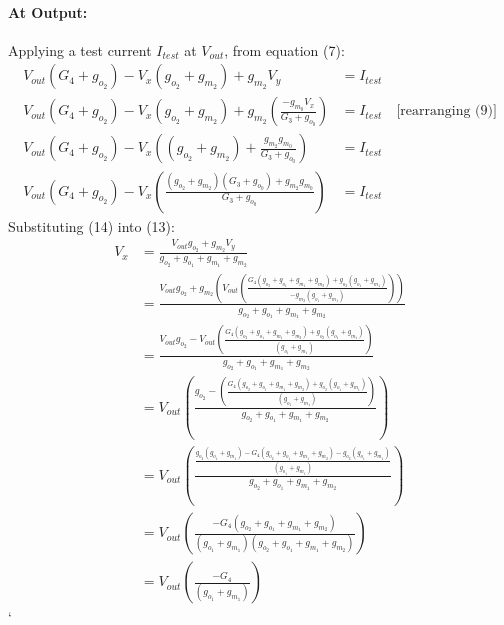\begin{enumerate}
    \paragraph{At Output:} Applying a test current $I_{test}$
      at $V_{out}$, from equation (7):
      \begin{align*}
        V_{out}(G_4 + g_{o_2}) - V_{x}(g_{o_2} + g_{m_2}) + g_{m_2}V_{y} &= I_{test} \\
        V_{out}(G_4 + g_{o_2}) - V_{x}(g_{o_2} + g_{m_2}) + g_{m_2}\left(\frac{-g_{m_0}V_{x}}{G_3 + g_{o_0}}\right) &= I_{test} \quad \text{[rearranging (9)]} \\
        V_{out}(G_4 + g_{o_2}) - V_{x}\left((g_{o_2} + g_{m_2}) + \frac{g_{m_2}g_{m_0}}{G_3 + g_{o_0}}\right) &= I_{test} \\
        V_{out}(G_4 + g_{o_2}) - V_{x}\left(\frac{(g_{o_2} + g_{m_2})(G_3 + g_{o_0}) + g_{m_2}g_{m_0}}{G_3 + g_{o_0}}\right) &= I_{test} \tag{16}
      \end{align*}
      Substituting (14) into (13):
      \begin{align*}
        V_{x} &= \frac{V_{out}g_{o_2} + g_{m_2}V_{y}}{g_{o_2} + g_{o_1} + g_{m_1} + g_{m_2}} \\
              &= \frac{V_{out}g_{o_2} + g_{m_2}\left(V_{out}\left(\frac{G_4(g_{o_2} + g_{o_1} + g_{m_1} + g_{m_2}) + g_{o_2}(g_{o_1} + g_{m_1})}{-g_{m_2}(g_{o_1} + g_{m_1})}\right)\right)}{g_{o_2} + g_{o_1} + g_{m_1} + g_{m_2}} \\
              &= \frac{V_{out}g_{o_2} - V_{out}\left(\frac{G_4(g_{o_2} + g_{o_1} + g_{m_1} + g_{m_2}) + g_{o_2}(g_{o_1} + g_{m_1})}{(g_{o_1} + g_{m_1})}\right)}{g_{o_2} + g_{o_1} + g_{m_1} + g_{m_2}} \\
              &= V_{out} \left(\frac{g_{o_2} - \left(\frac{G_4(g_{o_2} + g_{o_1} + g_{m_1} + g_{m_2}) + g_{o_2}(g_{o_1} + g_{m_1})}{(g_{o_1} + g_{m_1})}\right)}{g_{o_2} + g_{o_1} + g_{m_1} + g_{m_2}}\right) \\
              &= V_{out} \left(\frac{\frac{g_{o_2}(g_{o_1} + g_{m_1}) - G_4(g_{o_2} + g_{o_1} + g_{m_1} + g_{m_2}) - g_{o_2}(g_{o_1} + g_{m_1})}{(g_{o_1} + g_{m_1})}}{g_{o_2} + g_{o_1} + g_{m_1} + g_{m_2}}\right) \\
              &= V_{out} \left(\frac{- G_4(g_{o_2} + g_{o_1} + g_{m_1} + g_{m_2})}{(g_{o_1} + g_{m_1})(g_{o_2} + g_{o_1} + g_{m_1} + g_{m_2})}\right) \\
              &= V_{out} \left(\frac{- G_4}{(g_{o_1} + g_{m_1})}\right) \tag{17}
      \end{align*}`

\end{enumerate}
